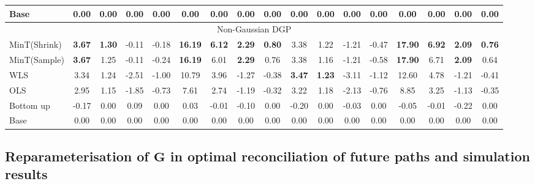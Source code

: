 \documentclass[12pt]{article}
\theoremstyle{definition}
\begin{document}
\begin{table}[H]
{\begin{tabular}{lcccccccccccccccc}
			Base & 0.00 & 0.00 & 0.00 & 0.00 & 0.00 & 0.00 & 0.00 & 0.00 & 0.00 & 0.00 & 0.00 & 0.00 & 0.00 & 0.00 & 0.00 & 0.00\\
			\toprule
			\multicolumn{17}{c}{Non-Gaussian DGP}\\
			\toprule
			
			MinT(Shrink) & \textbf{3.67} & \textbf{1.30} & -0.11 & -0.18 & \textbf{16.19} & \textbf{6.12} & \textbf{2.29} & \textbf{0.80} & 3.38 & 1.22 & -1.21 & -0.47 & \textbf{17.90} & \textbf{6.92} & \textbf{2.09} & \textbf{0.76}\\
			
			MinT(Sample) & \textbf{3.67} & 1.25 & -0.11 & -0.24 & \textbf{16.19} & 6.01 & \textbf{2.29} & 0.76 & 3.38 & 1.16 & -1.21 & -0.58 & \textbf{17.90} & 6.71 & \textbf{2.09} & 0.64\\
			
			WLS & 3.34 & 1.24 & -2.51 & -1.00 & 10.79 & 3.96 & -1.27 & -0.38 & \textbf{3.47} & \textbf{1.23} & -3.11 & -1.12 & 12.60 & 4.78 & -1.21 & -0.41\\
			
			OLS & 2.95 & 1.15 & -1.85 & -0.73 & 7.61 & 2.74 & -1.19 & -0.32 & 3.22 & 1.18 & -2.13 & -0.76 & 8.85 & 3.25 & -1.13 & -0.35\\
			
			Bottom up & -0.17 & 0.00 & 0.09 & 0.00 & 0.03 & -0.01 & -0.10 & 0.00 & -0.20 & 0.00 & -0.03 & 0.00 & -0.05 & -0.01 & -0.22 & 0.00\\
			
			Base & 0.00 & 0.00 & 0.00 & 0.00 & 0.00 & 0.00 & 0.00 & 0.00 & 0.00 & 0.00 & 0.00 & 0.00 & 0.00 & 0.00 & 0.00 & 0.00\\
			\bottomrule
		\end{tabular}
	}
\end{table}

\subsection{Reparameterisation of $\bm{G}$ in optimal reconciliation of future paths and simulation results} \label{Appen:ReparaG}
\end{document}
